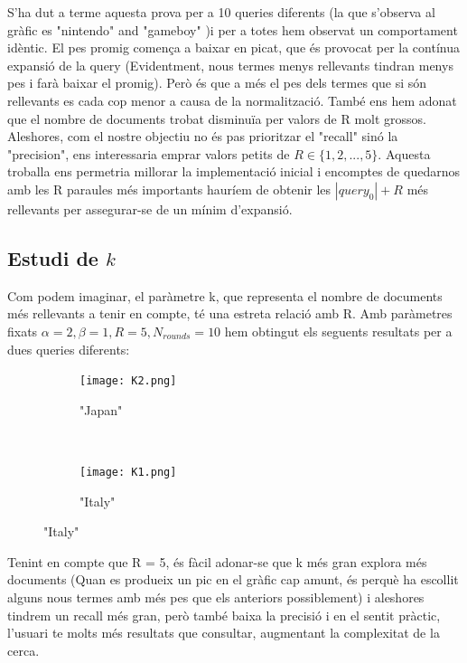 \documentclass[12pt]{article}
\begin{document}
S'ha dut a terme aquesta prova per a 10 queries diferents (la que s'observa al gràfic es "nintendo" and "gameboy" )i per a totes hem observat un comportament idèntic. El pes promig comença a baixar en picat, que és provocat per la contínua expansió de la query (Evidentment, nous termes menys rellevants tindran menys pes i farà baixar el promig). Però és que a més el pes dels termes que si són rellevants es cada cop menor a causa de la normalització. També ens hem adonat que el nombre de documents trobat disminuïa per valors de R molt grossos. Aleshores, com el nostre objectiu no és pas prioritzar el "recall" sinó la "precision", ens interessaria emprar valors petits de $R \in \{1,2,...,5\}$. Aquesta troballa ens permetria millorar la implementació inicial i encomptes de quedarnos amb les R paraules més importants hauríem de obtenir les $|query_0| + R$ més rellevants per assegurar-se de un mínim d'expansió.

\subsection{Estudi de $k$}
Com podem imaginar, el paràmetre k, que representa el nombre de documents més rellevants a tenir en compte, té una estreta relació amb R. Amb paràmetres fixats $\alpha = 2, \beta = 1, R = 5, N_{rounds} = 10$ hem obtingut els seguents resultats per a dues queries diferents:
\\

\begin{figure}[h!]
    \centering
    \hspace{-1cm}
    \begin{subfigure}[b]{0.45\textwidth}
        \texttt{[image: K2.png]}
        \caption{"Japan"}
        \label{fig:K1PPM}
    \end{subfigure}
    ~ %
    \begin{subfigure}[b]{0.45\textwidth}
        \texttt{[image: K1.png]}
        \caption{"Italy"}
        \label{fig:K2PPM}
    \end{subfigure}
\end{figure}
\FloatBarrier


Tenint en compte que R = 5, és fàcil adonar-se que k més gran explora més documents (Quan es produeix un pic en el gràfic cap amunt, és perquè ha escollit alguns nous termes amb més pes que els anteriors possiblement) i aleshores tindrem un recall més gran, però també baixa la precisió i en el sentit pràctic, l'usuari te molts més resultats que consultar, augmentant la complexitat de la cerca. 
\end{document}
